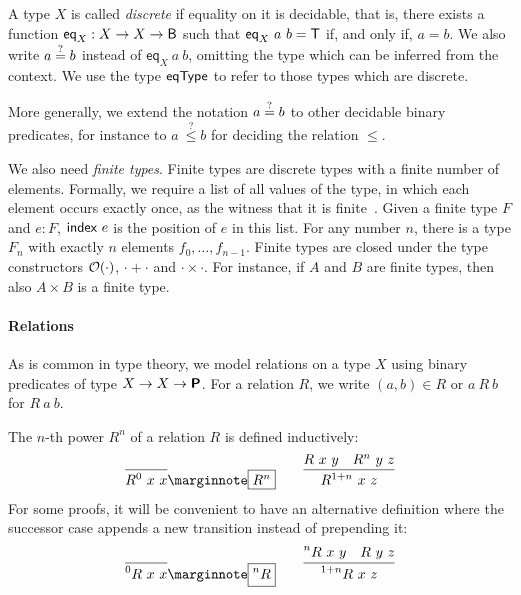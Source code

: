 A type $X$ is called \emph{discrete} if equality on it is decidable, that is, there exists a function $\textsf{eq}_X : X \rightarrow X \rightarrow \textsf{B}$ such that $\textsf{eq}_X~a~b = \mathsf{T}$ if, and only if, $a = b$. We also write $a\overset{?}{=}b$ instead of $\textsf{eq}_X~a~b$, omitting the type which can be inferred from the context. We use the type $\textsf{eqType}$ to refer to those types which are discrete.

More generally, we extend the notation $a\overset{?}{=}b$ to other decidable binary predicates, for instance to $a~\overset{?}{\le} b$ for deciding the relation $\le$.

We also need \emph{finite types}. Finite types are discrete types with a finite number of elements. Formally, we require a list of all values of the type, in which each element occurs exactly once, as the witness that it is finite~\cite{menz2016}. Given a finite type $F$ and $e : F$, $\textsf{index}~e$ is the position of $e$ in this list.
For any number $n$, there is a type $F_n$ with exactly $n$ elements $f_0, \ldots, f_{n-1}$.
Finite types are closed under the type constructors $\mathcal{O}{(\cdot)}$, $\cdot + \cdot$ and $\cdot \times \cdot$. For instance, if $A$ and $B$ are finite types, then also $A \times B$ is a finite type.

\paragraph{Relations}
As is common in type theory, we model relations on a type $X$ using binary predicates of type $X \rightarrow X \rightarrow \textsf{\bfseries P}$. 
For a relation $R$, we write $(a, b) \in R$ or $a~R~b$ for $R~a~b$. 

The $n$-th power $R^n$ of a relation $R$ is defined inductively:
\begin{align*}
  \infer{R^0~x~x}{}\mnote{$R^n$}
  \qquad
  \infer{R^{\natS{n}}~x~z}{R~x~y\quad R^n~y~z}
\end{align*}
For some proofs, it will be convenient to have an alternative definition where the successor case appends a new transition instead of prepending it:
\begin{align*}
  \infer{\prescript{0}{}R~x~x}{}\mnote{$\prescript{n}{}R$}
  \qquad
  \infer{\prescript{\natS{n}}{}R~x~z}{\prescript{n}{}R~x~y\quad R~y~z}
\end{align*}

